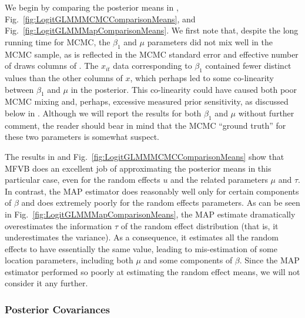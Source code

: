 \documentclass{article}\usepackage[]{graphicx}\usepackage[]{color}
\theoremstyle{definition}
\theoremstyle{plain}
\theoremstyle{plain}
\theoremstyle{plain}
\theoremstyle{definition}
\theoremstyle{plain}
\theoremstyle{plain}
\newcommand{\fig}[1]{Fig.~\ref{fig:#1}}
\begin{document}
We begin by comparing the posterior means in ,
\fig{LogitGLMMMCMCComparisonMeans}, and \fig{LogitGLMMMapComparisonMeans}.
We first note that, despite the long running time for MCMC, the $\beta_{1}$
and $\mu$ parameters did not mix well in the MCMC sample, as is reflected
in the MCMC standard error and effective number of draws columns of
. The $x_{it}$ data corresponding to
$\beta_{1}$ contained fewer distinct values than the other columns
of $x$, which perhaps led to some co-linearity between $\beta_{1}$
and $\mu$ in the posterior. This co-linearity could have caused both poor MCMC
mixing and, perhaps, excessive measured prior sensitivity, as discussed
below in . Although we will report
the results for both $\beta_{1}$ and $\mu$ without further comment,
the reader should bear in mind that the MCMC ``ground truth'' for
these two parameters is somewhat suspect.

The results in  and \fig{LogitGLMMMCMCComparisonMeans}
show that MFVB does an excellent job of approximating the posterior
means in this particular case, even for the random effects $u$ and
the related parameters $\mu$ and $\tau$. In contrast, the MAP estimator
does reasonably well only for certain components of $\beta$ and does
extremely poorly for the random effects parameters. As can be seen
in \fig{LogitGLMMMapComparisonMeans}, the MAP estimate dramatically
overestimates the information $\tau$ of the random effect distribution
(that is, it underestimates the variance). As a consequence, it estimates
all the random effects to have essentially the same value, leading
to mis-estimation of some location parameters, including both $\mu$
and some components of $\beta$. Since the MAP estimator performed
so poorly at estimating the random effect means, we will not consider
it any further.

\subsubsection{Posterior Covariances}
\end{document}
